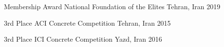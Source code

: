 



\begin{cvhonors}


  \cvhonor
    {Membership Award} %
    {National Foundation of the Elites} %
    {Tehran, Iran} %
    {2019} %

  \cvhonor
    {3rd Place} %
    {ACI Concrete Competition} %
    {Tehran, Iran} %
    {2015} %
    
  \cvhonor
    {3rd Place} %
    {ICI Concrete Competition} %
    {Yazd, Iran} %
    {2016} %
    

\end{cvhonors}


    {} %
    {} %
    {} %
    {} %